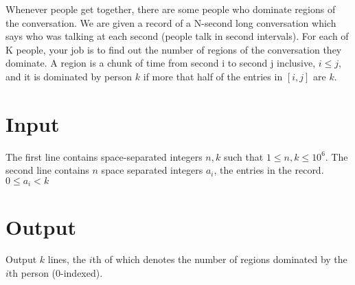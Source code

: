 
Whenever people get together, there are some people who dominate regions of the conversation. We are given a record of a N-second long conversation which says who was talking at each second (people talk in second intervals). For each of K people, your job is to find out the number of regions of the conversation they dominate. A region is a chunk of time from second i to second j inclusive, $i \leq j$, and it is dominated by person $k$ if more that half of the entries in $[i,j]$ are $k$.

\section*{Input}
The first line contains space-separated integers $n,k$ such that $1 \leq n,k \leq 10^6$.
The second line contains $n$ space separated integers $a_i$, the entries in the record. $0 \leq a_i < k$

\section*{Output}
Output $k$ lines, the $i$th of which denotes the number of regions dominated by the $i$th person ($0$-indexed).

